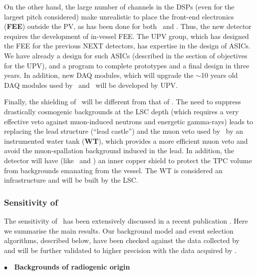 
On the other hand, the large number of channels in the DSPs (even for the largest pitch considered) make unrealistic to place the front-end electronics ({\bf FEE}) outside the PV, as has been done for both \NEW\ and \Next. Thus, the new detector requires the development of in-vessel FEE. The UPV group, which has designed the FEE for the previous NEXT detectors, has expertise in the design of ASICs. We have already a design for such ASICs (described in the section of objectives for the UPV), and a program to complete prototypes and a final design in three years. In addition, new DAQ modules, which will upgrade the $\sim$10 years old DAQ modules used by \NEW\ and \Next\ will be developed by UPV. 


Finally, the shielding of \NHD\ will be different from that of \Next. The need to suppress drastically cosmogenic backgrounds at the LSC depth (which requires a very effective veto against muon-induced neutrons and energetic gamma-rays) leads to replacing the lead structure (``lead castle'') and the muon veto used by \Next\ by an instrumented water tank ({\bf WT}), which provides a more efficient muon veto and avoid the muon-spallation background induced in the lead. In addition, the detector will have (like \NEW\ and \Next) an inner copper shield to protect the TPC volume from backgrounds emanating from the vessel. The WT is considered an infrastructure and will be built by the LSC. 


\subsubsection{Sensitivity of \NHD}
\label{sec:BackgroundsAtTheTonneScale}

The sensitivity of \NHD\ has been extensively discussed in a recent publication \cite{NEXT:2020amj}. Here we summarise the main results. 
Our background model and event selection algorithms, described below, have been checked against the data collected by \NEW\ \cite{Novella:2019cne} and will be further validated to higher precision with the data acquired  by \Next. 


{\bf $\bullet$~ Backgrounds of radiogenic origin}

